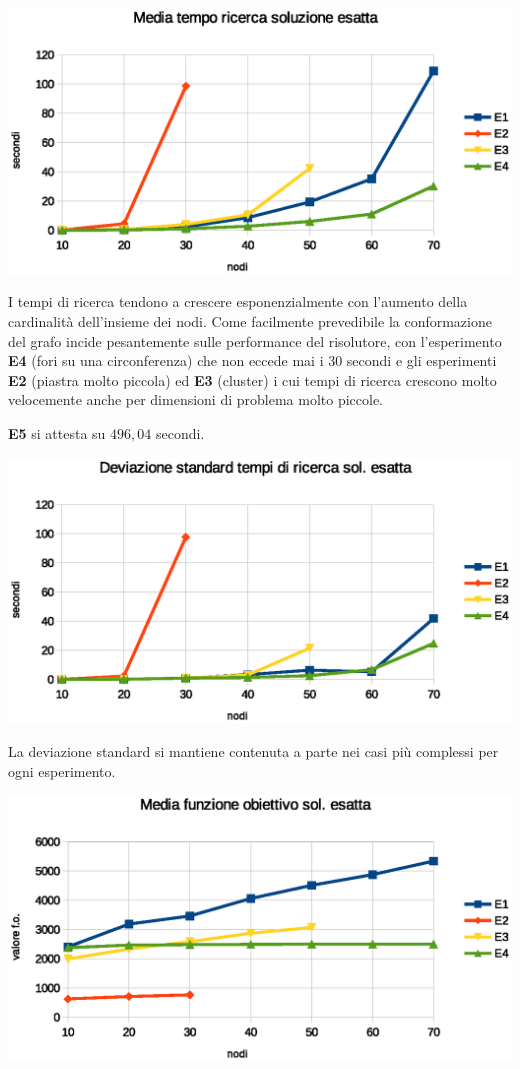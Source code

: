 \documentclass[a4paper]{article}
\begin{document}
                \includegraphics[scale=0.7]{img/exavgtime}

                I tempi di ricerca tendono a crescere esponenzialmente con l'aumento della cardinalit\`a dell'insieme dei nodi.
                Come facilmente prevedibile la conformazione del grafo incide pesantemente sulle performance del risolutore, con l'esperimento \textbf{E4} (fori su una circonferenza) che non eccede
                mai i 30 secondi e gli esperimenti \textbf{E2} (piastra molto piccola) ed \textbf{E3} (cluster) i cui tempi di ricerca crescono molto velocemente anche per dimensioni di problema molto piccole.


                \textbf{E5} si attesta su $496,04$ secondi.

                \includegraphics[scale=0.7]{img/exadevtime}

                La deviazione standard si mantiene contenuta a parte nei casi pi\`u complessi per ogni esperimento.

                \includegraphics[scale=0.7]{img/exavgobj}
\end{document}
